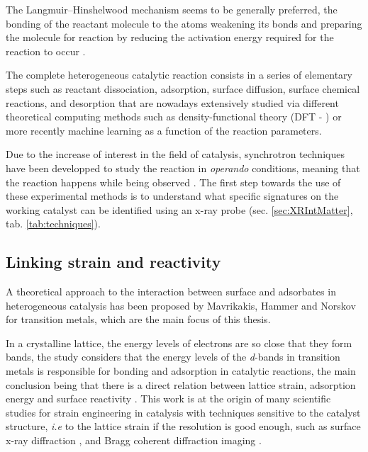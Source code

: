 
The Langmuir–Hinshelwood mechanism seems to be generally preferred, the bonding of the reactant molecule to the atoms weakening its bonds and preparing the molecule for reaction by reducing the activation energy required for the reaction to occur \parencite{Baxter2002}.

The complete heterogeneous catalytic reaction consists in a series of elementary steps such as reactant dissociation, adsorption, surface diffusion, surface chemical reactions, and desorption that are nowadays extensively studied via different theoretical computing methods such as density-functional theory (DFT - \cite{Reuter2004, Molenbroek2009, Yawei2015, Gaggioli2019, Chatelier2020}) or more recently machine learning \parencite{Kitchin2018, Schlexer2019, Anstine2023} as a function of the reaction parameters.

Due to the increase of interest in the field of catalysis, synchrotron techniques have been developped to study the reaction in \textit{operando} conditions, meaning that the reaction happens while being observed \parencite{Meirer2018}.
The first step towards the use of these experimental methods is to understand what specific signatures on the working catalyst can be identified using an x-ray probe (sec. \ref{sec:XRIntMatter}, tab. \ref{tab:techniques}).

\subsection{Linking strain and reactivity}

A theoretical approach to the interaction between surface and adsorbates in heterogeneous catalysis has been proposed by Mavrikakis, Hammer and Norskov \parencite*{Mavrikakis1998, Hammer2000} for transition metals, which are the main focus of this thesis.

In a crystalline lattice, the energy levels of electrons are so close that they form bands, the study considers that the energy levels of the \textit{d}-bands in transition metals is responsible for bonding and adsorption in catalytic reactions, the main conclusion being that there is a direct relation between lattice strain, adsorption energy and surface reactivity \parencite{Mavrikakis1998, Kitchin2004}.
This work is at the origin of many scientific studies for strain engineering in catalysis with techniques sensitive to the catalyst structure, \textit{i.e} to the lattice strain if the resolution is good enough, such as surface x-ray diffraction \parencite{Resta2020a}, and Bragg coherent diffraction imaging \parencite{Sneed2015, Kim2019, Bjorling2019, Passos2020, Carnis2021a, Carnis2021b}.

